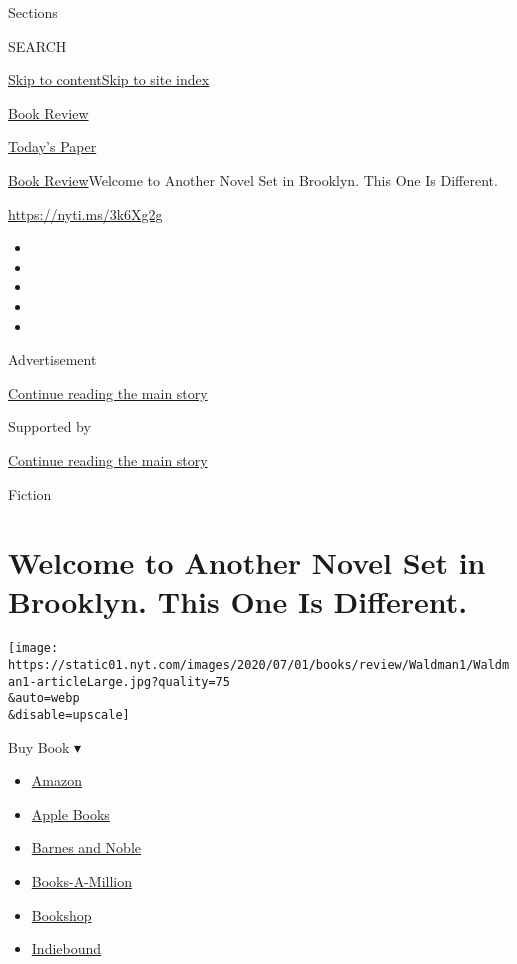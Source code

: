 Sections

SEARCH

\protect\hyperlink{site-content}{Skip to
content}\protect\hyperlink{site-index}{Skip to site index}

\href{https://www.nytimes.com/section/books/review}{Book Review}

\href{https://myaccount.nytimes.com/auth/login?response_type=cookie\&client_id=vi}{}

\href{https://www.nytimes.com/section/todayspaper}{Today's Paper}

\href{/section/books/review}{Book Review}\textbar{}Welcome to Another
Novel Set in Brooklyn. This One Is Different.

\url{https://nyti.ms/3k6Xg2g}

\begin{itemize}
\item
\item
\item
\item
\item
\end{itemize}

Advertisement

\protect\hyperlink{after-top}{Continue reading the main story}

Supported by

\protect\hyperlink{after-sponsor}{Continue reading the main story}

Fiction

\hypertarget{welcome-to-another-novel-set-in-brooklyn-this-one-is-different}{%
\section{Welcome to Another Novel Set in Brooklyn. This One Is
Different.}\label{welcome-to-another-novel-set-in-brooklyn-this-one-is-different}}

\texttt{[image: https://static01.nyt.com/images/2020/07/01/books/review/Waldman1/Waldman1-articleLarge.jpg?quality=75\\\&auto=webp\\\&disable=upscale]}

Buy Book ▾

\begin{itemize}
\tightlist
\item
  \href{https://www.amazon.com/gp/search?index=books\&tag=NYTBSREV-20\&field-keywords=Kings+County+David+Goodwillie}{Amazon}
\item
  \href{https://du-gae-books-dot-nyt-du-prd.appspot.com/buy?title=Kings+County\&author=David+Goodwillie}{Apple
  Books}
\item
  \href{https://www.anrdoezrs.net/click-7990613-11819508?url=https\%3A\%2F\%2Fwww.barnesandnoble.com\%2Fw\%2F\%3Fean\%3D9781501192135}{Barnes
  and Noble}
\item
  \href{https://www.anrdoezrs.net/click-7990613-35140?url=https\%3A\%2F\%2Fwww.booksamillion.com\%2Fp\%2FKings\%2BCounty\%2FDavid\%2BGoodwillie\%2F9781501192135}{Books-A-Million}
\item
  \href{https://bookshop.org/a/3546/9781501192135}{Bookshop}
\item
  \href{https://www.indiebound.org/book/9781501192135?aff=NYT}{Indiebound}
\end{itemize}

